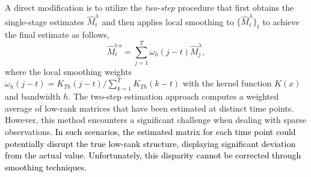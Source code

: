 \documentclass[12pt]{article}
\newcommand{\change}[1]{\textcolor{black}{#1}}
\begin{document}
  A direct modification is to utilize the {\it two-step} procedure that first obtains the single-stage estimates $\widehat{M}^\lambda_t$ and then applies local smoothing to $\{\widehat{M}_t^\lambda\}_t$ to achieve the final estimate as follows,
   \begin{equation}
   \label{eq:twostep}
      \widehat{M}_{t}^{\text{t-s}} = \sum_{j=1}^T \omega_h(j-t)\widehat{M}_j^\lambda,
   \end{equation}
 where the local smoothing weights 
  $\omega_h(j-t)=K_{Th}\left(j-t\right)/\sum_{k=1}^T K_{Th}\left(k-t\right)$
  with the kernel function $K(x)$ and bandwidth $h$. 
  The two-step estimation approach computes a weighted average of low-rank matrices that have been estimated at distinct time points. However, this method encounters a significant challenge when dealing with sparse observations. \change{In such scenarios, the estimated matrix for each time point could potentially disrupt the true low-rank structure, displaying significant deviation from the actual value. Unfortunately, this disparity cannot be corrected through smoothing techniques.}
  
\end{document}
